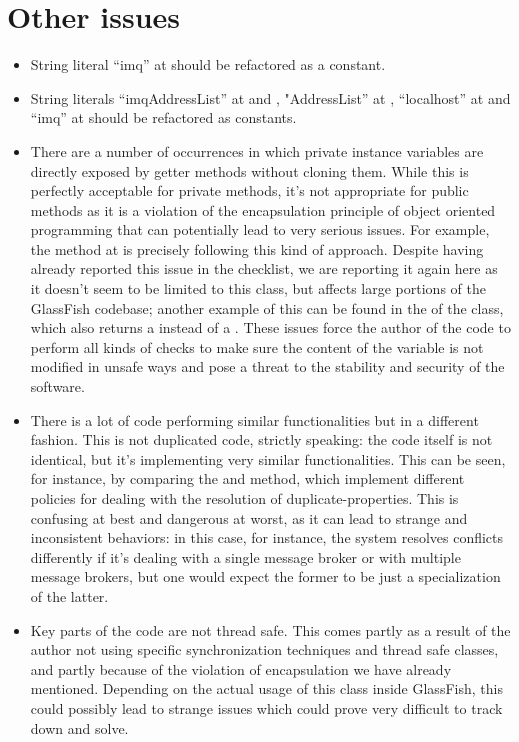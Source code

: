 \section{Other issues}
\begin{itemize}
	\item String literal “imq” at  should be refactored as a constant.	
	\item String literals “imqAddressList” at  and , "AddressList” at , “localhost” at  and “imq” at  should be refactored as constants. 
	\item There are a number of occurrences in which private instance variables are directly exposed by getter methods without cloning them. While this is perfectly acceptable for private methods, it's not appropriate for public methods as it is a violation of the encapsulation principle of object oriented programming that can potentially lead to very serious issues. For example, the  method at  is precisely following this kind of approach. Despite having already reported this issue in the checklist, we are reporting it again here as it doesn't seem to be limited to this class, but affects large portions of the GlassFish codebase; another example of this can be found in the  of the  class, which also returns a  instead of a . These issues force the author of the code to perform all kinds of checks to make sure the content of the variable is not modified in unsafe ways and pose a threat to the stability and security of the software.
	\item There is a lot of code performing similar functionalities but in a different fashion. This is not duplicated code, strictly speaking: the code itself is not identical, but it's implementing very similar functionalities. This can be seen, for instance, by comparing the  and  method, which implement different policies for dealing with the resolution of duplicate-properties. This is confusing at best and dangerous at worst, as it can lead to strange and inconsistent behaviors: in this case, for instance, the system resolves conflicts differently if it's dealing with a single message broker or with multiple message brokers, but one would expect the former to be just a specialization of the latter. 
	 \item Key parts of the code are not thread safe. This comes partly as a result of the author not using specific synchronization techniques and thread safe classes, and partly because of the violation of encapsulation we have already mentioned. Depending on the actual usage of this class inside GlassFish, this could possibly lead to strange issues which could prove very difficult to track down and solve. 
\end{itemize}
	 
